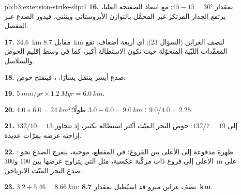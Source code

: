 \begin{solution}{pb:b3:extension-strike-slip:1}
\textbf{16.} بمقدار $45 - 15 = \ang{30}$: مع ابتعاد الصفيحة العليا، يرتفع
الجدار المرتكز غير المحمَّل بالتوازن الأيزوستاتي وينثني، فيدور الصدع عبر
المفصل.

\textbf{17.} \qty{34.6}{km} مقابل \qty{8.7}{km} لنصف الغرابن (السؤال
23): أي أربعة أضعاف. تقع المعقّدات اللبّية المتحوّلة حيث تكون الاستطالة أكبر، كما في
وسط إقليم الحوض والسلاسل.

\textbf{18.} صدع أيسر ينتقل يسارًا: ، فينفتح حوض.

\textbf{19.} $\qty{5}{mm/yr}\times\qty{1.2}{Myr} = \qty{6.0}{km}$.

\textbf{20.} $4.0\times6.0 = \qty{24}{km^2}$؛ $3.0 + 6.0 = \qty{9.0}{km}$ طولًا؛
$9.0/4.0 = 2.25$.

\textbf{21.} $132/10 = 13$ إلى $132/7 = 19$: حوض البحر الميّت أكثر
استطالة بكثير، إذ تتجاوز إزاحته عرضه بمرّات عديدة.

\textbf{22.} : ظهرة مدفوعة إلى الأعلى بين الفروع؛ في
المقطع،  موجبة، ينفرج الصدع نحو الأعلى إلى فروع
ذات مركّبة عكسية، مثل التي يتراوح عرضها بين 100 و\qty{300}{m} على
صدع البحر الميّت الانزياحي.

\textbf{23.} $3.2 + 5.46 = \qty{8.66}{km}$: نصف غرابن ميرو قد استُطيل
بمقدار \textbf{\qty[text-series-to-math=true]{8.7}{km}}.
\end{solution}
